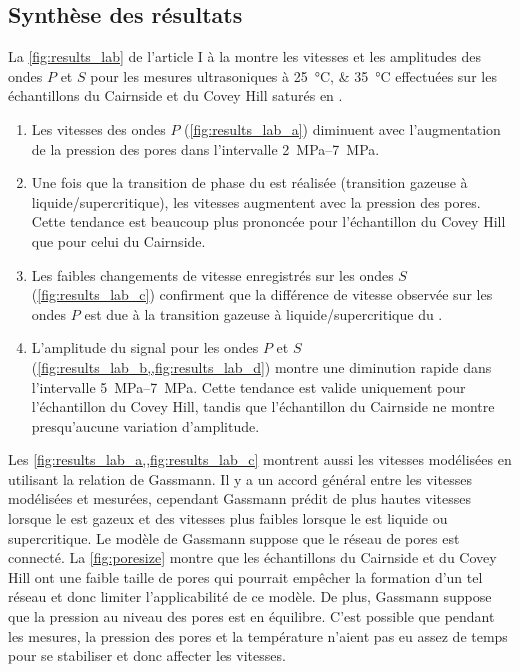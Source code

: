 \subsection{Synthèse des résultats}
La \cref{fig:results_lab} de l'article I à la  montre
les vitesses et les amplitudes des ondes $P$ et $S$ pour les mesures
ultrasoniques à \SIlist{25;35}{\degreeCelsius} effectuées sur les échantillons
du Cairnside et du Covey Hill saturés en .
\begin{enumerate}[-]
\item Les vitesses des ondes $P$ (\cref{fig:results_lab_a}) diminuent avec
l'augmentation de la pression des pores dans l'intervalle
\SIrange{2}{7}{\mega\pascal}.
\item Une fois que la transition de phase du  est réalisée (transition
gazeuse à liquide/supercritique), les vitesses augmentent avec la pression des
pores. Cette tendance est beaucoup plus prononcée pour l’échantillon du Covey
Hill que pour celui du Cairnside.
\item Les faibles changements de vitesse enregistrés sur les ondes $S$
(\cref{fig:results_lab_c}) confirment que la différence de vitesse observée sur
les ondes $P$ est due à la transition gazeuse à liquide/supercritique du
.
\item L'amplitude du signal pour les ondes $P$ et $S$
(\cref{fig:results_lab_b,,fig:results_lab_d}) montre une diminution rapide dans
l'intervalle \SIrange{5}{7}{\mega\pascal}. Cette tendance est valide uniquement
pour l'échantillon du Covey Hill, tandis que l’échantillon du Cairnside ne
montre presqu'aucune variation d'amplitude.
\end{enumerate}
Les \cref{fig:results_lab_a,,fig:results_lab_c} montrent aussi les vitesses
modélisées en utilisant la relation de Gassmann. Il y a un accord général entre
les vitesses modélisées et mesurées, cependant Gassmann prédit de plus hautes
vitesses lorsque le  est gazeux et des vitesses plus faibles lorsque le
 est liquide ou supercritique. Le modèle de Gassmann suppose que le
réseau de pores est connecté. La \cref{fig:poresize} montre que les
échantillons du Cairnside et du Covey Hill ont une faible taille de pores qui
pourrait empêcher la formation d’un tel réseau et donc limiter l’applicabilité
de ce modèle. De plus, Gassmann suppose que la pression au niveau des pores est
en équilibre. C’est possible que pendant les mesures, la pression des pores et
la température n’aient pas eu assez de temps pour se stabiliser et donc affecter
les vitesses.
